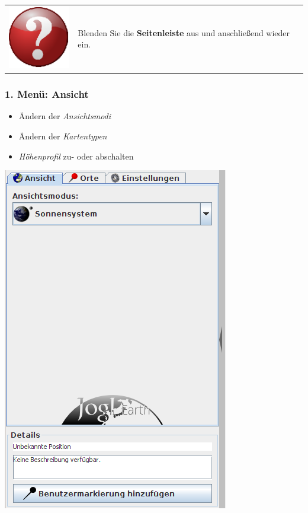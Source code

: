 \documentclass[10pt]{scrreprt}
\newcommand{\textref}[1]{\mbox{\raisebox{0.1ex}{\small$\rightarrow$ }\textit{#1}}}
\begin{document}
\vspace{3mm}
\begin{tabular}{>{\centering \arraybackslash}m{1cm} m{14cm}} \index{Benutzeroberfläche!Seitenleiste} \index{Seitenleiste}
\includegraphics[scale=0.5]{images/quest.eps} & Blenden Sie die \textbf{Seitenleiste} aus und anschließend wieder ein.
\end{tabular}


\vspace{10mm}
\begin{minipage}[t]{9cm}
\vspace{-40mm}
\subsubsection{1. Menü: Ansicht} 
	\begin{itemize}
	\item Ändern der \textref{Ansichtsmodi} 
	\item Ändern der \textref{Kartentypen} 
	\item \textref{Höhenprofil} zu- oder abschalten 
	\end{itemize}
\end{minipage}
\begin{minipage}{7cm}
\centering
\includegraphics[scale=0.4]{images/anzeige_tab.png}
\end{minipage}
\end{document}
